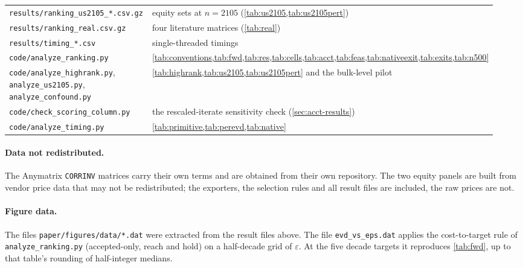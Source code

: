 \begin{table}[h]
\begin{tabular}{p{0.40\linewidth}p{0.54\linewidth}}
\texttt{results/ranking\_us2105\_*.csv.gz} & equity sets at $n=2105$ (\cref{tab:us2105,tab:us2105pert})\\
\texttt{results/ranking\_real.csv.gz} & four literature matrices (\cref{tab:real})\\
\texttt{results/timing\_*.csv} & single-threaded timings\\
\texttt{code/analyze\_ranking.py} & \cref{tab:conventions,tab:fwd,tab:res,tab:cells,tab:acct,tab:feas,tab:nativeexit,tab:exits,tab:n500}\\
\texttt{code/analyze\_highrank.py}, \texttt{analyze\_us2105.py}, \texttt{analyze\_confound.py} & \cref{tab:highrank,tab:us2105,tab:us2105pert} and the bulk-level pilot\\
\texttt{code/check\_scoring\_column.py} & the rescaled-iterate sensitivity check (\cref{sec:acct-results})\\
\texttt{code/analyze\_timing.py} & \cref{tab:primitive,tab:perevd,tab:native}\\
\bottomrule
\end{tabular}
\end{table}

\paragraph{Data not redistributed.}
The Anymatrix \texttt{CORRINV} matrices carry their own terms and are obtained
from their own repository. The two equity panels are built from vendor price
data that may not be redistributed; the exporters, the selection rules and all
result files are included, the raw prices are not.

{\sloppy
\paragraph{Figure data.} The files \texttt{paper/figures/data/*.dat} were
extracted from the result files above. The file \texttt{evd\_vs\_eps.dat}
applies the cost-to-target rule of \texttt{analyze\_ranking.py}
(accepted-only, reach and hold) on a half-decade grid of $\varepsilon$. At the
five decade targets it reproduces \cref{tab:fwd}, up to that table's rounding
of half-integer medians.\par}
